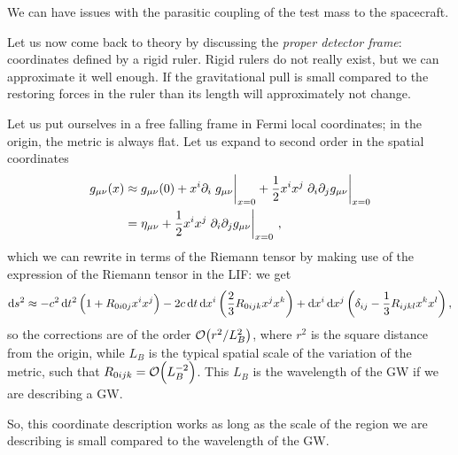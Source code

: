 \documentclass[main.tex]{subfiles}
\begin{document}
We can have issues with the parasitic coupling of the test mass to the spacecraft. 

Let us now come back to theory by discussing the \emph{proper detector frame}: coordinates defined by a rigid ruler. 
Rigid rulers do not really exist, but we can approximate it well enough. If the gravitational pull is small compared to the restoring forces in the ruler than its length will approximately not change. 

Let us put ourselves in a free falling frame in Fermi local coordinates; in the origin, the metric is always flat. Let us expand to second order in the spatial coordinates 
%
\begin{subequations}
\begin{align}
g_{\mu \nu } (x) &\approx g_{\mu \nu } (0)
+ x^{i} \partial_{i} \eval{g_{\mu \nu }}_{x=0} 
+ \frac{1}{2} x^{i} x^{j} \eval{\partial_{i} \partial_{j} g_{\mu \nu }}_{x=0}  \\
&= \eta_{\mu \nu } + \frac{1}{2} x^{i} x^{j} \eval{\partial_{i} \partial_{j} g_{\mu \nu }}_{x=0}
\,,
\end{align}
\end{subequations}
%
which we can rewrite in terms of the Riemann tensor by making use of the expression of the Riemann tensor in the LIF: we get 
%
\begin{align}
\dd{s^2} \approx - c^2 \dd{t^2} \qty(1 + R_{0i0j} x^{i}x^{j})
-2 c \dd{t} \dd{x^{i}} \qty(\frac{2}{3}R_{0ijk} x^{j}x^{k})
+ \dd{x^{i}} \dd{x^{j}} \qty(\delta_{ij} - \frac{1}{3} R_{ijkl} x^{k} x^{l})
\,,
\end{align}
%
so the corrections are of the order \(\order{r^2 / L_B^2}\), where \(r^2\) is the square distance from the origin, while \(L_B\) is the typical spatial scale of the variation of the metric, such that \(R_{0ijk} = \order{L_B^{-2}}\). 
This \(L_B\) is the wavelength of the GW if we are describing a GW.

So, this coordinate description works as long as the scale of the region we are describing is small compared to the wavelength of the GW. 
\end{document}

